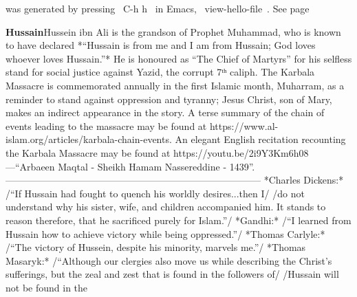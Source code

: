 \documentclass[11pt]{article}
\begin{document}
was generated by pressing ~C-h h~ in Emacs, ~view-hello-file~. See page \pageref{org-special-block-extras-glossary-declaration-site-Hello}

\vspace{1em}\textbf{Hussain}\quad\label{org-special-block-extras-glossary-Hussain}Hussein ibn Ali is the grandson of Prophet Muhammad, who is known to have declared *“Hussain is from me and I am from Hussain; God loves whoever loves Hussain.”*  He is honoured as “The Chief of Martyrs” for his selfless stand for social justice against Yazid, the corrupt 7ᵗʰ caliph. The Karbala Massacre is commemorated annually in the first Islamic month, Muharram, as a reminder to stand against oppression and tyranny; Jesus Christ, son of Mary, makes an indirect appearance in the story.  A terse summary of the chain of events leading to the massacre may be found at https://www.al-islam.org/articles/karbala-chain-events.  An elegant English recitation recounting the Karbala Massacre may be found at https://youtu.be/2i9Y3Km6h08 ---“Arbaeen Maqtal - Sheikh Hamam Nassereddine - 1439”. --------------------------------------------------------------------------------  *Charles Dickens:* /“If Hussain had fought to quench his worldly desires...then I/ /do not understand why his sister, wife, and children accompanied him. It stands to reason therefore, that he sacrificed purely for Islam.”/  *Gandhi:* /“I learned from Hussain how to achieve victory while being oppressed.”/  *Thomas Carlyle:* /“The victory of Hussein, despite his minority, marvels me.”/  *Thomas Masaryk:* /“Although our clergies also move us while describing the Christ's sufferings, but the zeal and zest that is found in the followers of/ /Hussain will not be found in the 
\end{document}

